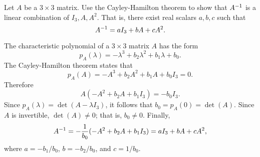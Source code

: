 \documentclass{ximera}
\begin{document}
\begin{exercise} \label{c10.5.5C}
Let $A$ be a $3\times 3$ matrix.  Use the Cayley-Hamilton theorem to show that
$A^{-1}$ is a linear combination of $I_3,A,A^2$.  That is, there exist real 
scalars $a,b,c$ such that 
\[
A^{-1} = aI_3 + bA + cA^2.
\]

\begin{solution}

The characteristic polynomial of a $3\times 3$ matrix $A$ has the form 
\[
p_A(\lambda) = -\lambda^3 + b_2\lambda^2 + b_1\lambda + b_0.
\]
The Cayley-Hamilton theorem states that 
\[
p_A(A) = -A^3 + b_2A^2 + b_1A + b_0I_3 = 0.
\]
Therefore
\[
A(-A^2 +b_2A +b_1I_3) = -b_0I_3.
\]
Since $p_A(\lambda) =\det(A-\lambda I_3)$, it follows that $b_0=p_A(0)=\det(A)$.
Since $A$ is invertible, $\det(A)\neq 0$; that is, $b_0\neq 0$.  Finally, 
\[
A^{-1} = -\frac{1}{b_0}(-A^2+b_2A+b_1I_3) = aI_3 + bA + cA^2,
\]
where $a = -b_1/b_0$, $b = -b_2/b_0$, and $c=1/b_0$.



\end{solution}
\end{exercise}

\CEXER
\end{document}
